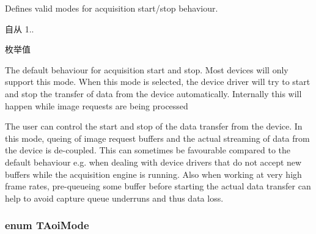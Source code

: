 Defines valid modes for acquisition start/stop behaviour. 

\begin{DoxySince}{自从}
1.. 
\end{DoxySince}
\begin{Desc}
\item[枚举值]\par
\begin{description}
\item[{\em 
\hypertarget{group___common_interface_gga5c60e3239df59a2d82b529ebc7ed13f5a26b25f4c47d6a2e2c852499fbfdc8514}{assb\+Default}\label{group___common_interface_gga5c60e3239df59a2d82b529ebc7ed13f5a26b25f4c47d6a2e2c852499fbfdc8514}
}]The default behaviour for acquisition start and stop. Most devices will only support this mode. When this mode is selected, the device driver will try to start and stop the transfer of data from the device automatically. Internally this will happen while image requests are being processed \item[{\em 
\hypertarget{group___common_interface_gga5c60e3239df59a2d82b529ebc7ed13f5aa7ee6255187e04caeec5760498086e02}{assb\+User}\label{group___common_interface_gga5c60e3239df59a2d82b529ebc7ed13f5aa7ee6255187e04caeec5760498086e02}
}]The user can control the start and stop of the data transfer from the device. In this mode, queing of image request buffers and the actual streaming of data from the device is de-\/coupled. This can sometimes be favourable compared to the default behaviour e.\+g. when dealing with device drivers that do not accept new buffers while the acquisition engine is running. Also when working at very high frame rates, pre-\/queueing some buffer before starting the actual data transfer can help to avoid capture queue underruns and thus data loss. \end{description}
\end{Desc}
\hypertarget{group___common_interface_gae7940d967323243f7d4ebdb5cc8045cb}{
\subsubsection[{T\+Aoi\+Mode}]{\setlength{\rightskip}{0pt plus 5cm}enum {\bf T\+Aoi\+Mode}}}\label{group___common_interface_gae7940d967323243f7d4ebdb5cc8045cb}



